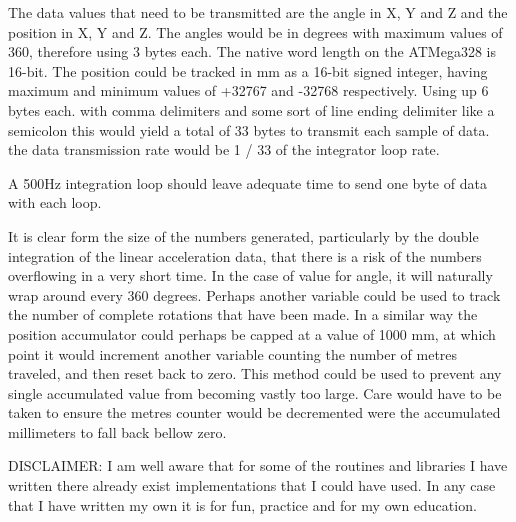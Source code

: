 \documentclass[10pt, a4paper]{article}
\def\vs{\vspace{6pt}}
\begin{document}
\vs
The data values that need to be transmitted are the angle in X, Y and Z and the position in X, Y and Z. The angles would be in degrees with maximum values of 360, therefore using 3 bytes each. The native word length on the ATMega328 is 16-bit. The position could be tracked in mm as a 16-bit signed integer, having maximum and minimum values of +32767 and -32768 respectively. Using up 6 bytes each.
with comma delimiters and some sort of line ending delimiter like a semicolon this would yield a total of 33 bytes to transmit each sample of data. the data transmission rate would be 1 / 33 of the integrator loop rate.

\vs
A 500Hz integration loop should leave adequate time to send one byte of data with each loop.

\vs
It is clear form the size of the numbers generated, particularly by the double integration of the linear acceleration data, that there is a risk of the numbers overflowing in a very short time. In the case of value for angle, it will naturally wrap around every 360 degrees. Perhaps another variable could be used to track the number of complete rotations that have been made. In a similar way the position accumulator could perhaps be capped at a value of 1000 mm, at which point it would increment another variable counting the number of metres traveled, and then reset back to zero. This method could be used to prevent any single accumulated value from becoming vastly too large. Care would have to be taken to ensure the metres counter would be decremented were the accumulated millimeters to fall back bellow zero.




\vs
DISCLAIMER: I am well aware that for some of the routines and libraries I have written there already exist implementations that I could have used. In any case that I have written my own it is for fun, practice and for my own education. 
\end{document}
